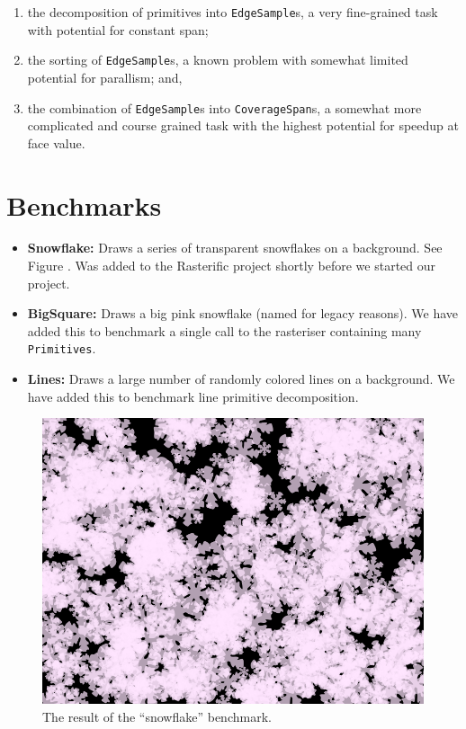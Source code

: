 \documentclass[12pt]{beamer}
\begin{document}
\begin{frame}
\begin{enumerate}
\item the decomposition of primitives into \texttt{EdgeSample}s, a very fine-grained task with potential for constant span;
\item the sorting of \texttt{EdgeSample}s, a known problem with somewhat limited potential for parallism; and,
\item the combination of \texttt{EdgeSample}s into \texttt{CoverageSpan}s, a somewhat more complicated and course grained task with the highest potential for speedup at face value.
\end{enumerate}
\end{frame}
\section{Benchmarks}\label{sec:benchmarks}

\begin{frame}
\begin{itemize}
\item \textbf{Snowflake:} Draws a series of transparent snowflakes on a background. See Figure . Was added to the Rasterific project
   shortly before we started our project.
\item \textbf{BigSquare:} Draws a big pink snowflake (named for legacy reasons). We have added this to benchmark a single call to the rasteriser containing many \texttt{Primitives}. 
\item \textbf{Lines:} Draws a large number of randomly colored lines on a background. 
  We have added this to benchmark line primitive decomposition.
\end{itemize}
\end{frame}
\begin{frame}
\begin{figure}[h!]
  \centering
  \includegraphics[width=.4\linewidth]{../flakes}
  \caption{The result of the ``snowflake'' benchmark.}
  \label{fig:snowflakes}
\end{figure}
\end{frame}
\end{document}
